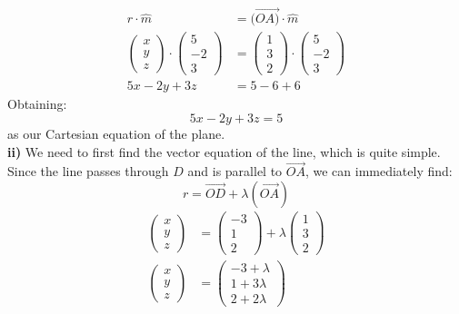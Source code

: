 \documentclass[hidelinks, a4paper, 12pt]{article}
\newcommand{\bd}{\textbf}
\newcommand{\mhat}{\hat{m}}
\newcommand{\n}{\\[\baselineskip]}
\begin{document}
            \[\begin{split}
                r \cdot \mhat &= (\vec{OA)} \cdot \mhat\\
                \begin{pmatrix} x \\ y \\ z \end{pmatrix} \cdot \begin{pmatrix} 5 \\ -2 \\ 3 \end{pmatrix} &= \begin{pmatrix} 1 \\ 3 \\ 2 \end{pmatrix} \cdot \begin{pmatrix} 5 \\ -2 \\ 3 \end{pmatrix}\\
                5x - 2y + 3z &= 5 - 6 + 6
            \end{split}\]
            Obtaining:
            \[5x - 2y + 3z = 5\]
            as our Cartesian equation of the plane.\n
            \bd{ii) } We need to first find the vector equation of the line, which is quite simple. Since the line passes through $D$ and is parallel to $\vec{OA}$,
            we can immediately find:
            \[r = \vec{OD} + \lambda (\vec{OA})\]
            \[\begin{split}
                \begin{pmatrix} x \\ y \\ z \end{pmatrix} &= \begin{pmatrix} -3 \\ 1 \\ 2 \end{pmatrix} + \lambda \begin{pmatrix} 1 \\ 3 \\ 2 \end{pmatrix}\\
                \begin{pmatrix} x \\ y \\ z \end{pmatrix} &= \begin{pmatrix} -3 + \lambda \\ 1 + 3\lambda \\ 2 + 2\lambda \end{pmatrix}    
            \end{split}\]
\end{document}
